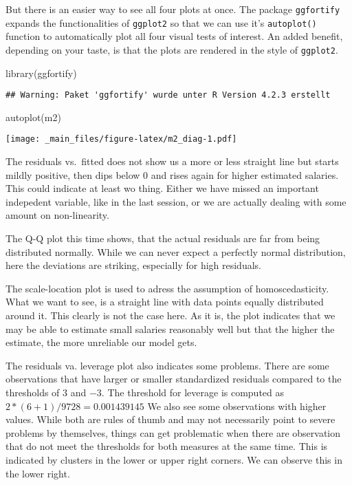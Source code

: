 \documentclass[
]{book}
\newenvironment{Shaded}{\begin{snugshade}}{\end{snugshade}}
\newcommand{\FunctionTok}[1]{\textcolor[rgb]{0.00,0.00,0.00}{#1}}
\newcommand{\NormalTok}[1]{#1}
\begin{document}
But there is an easier way to see all four plots at once. The package
\texttt{ggfortify} expands the functionalities of \texttt{ggplot2} so that we can use it's
\texttt{autoplot()} function to automatically plot all four visual tests of interest.
An added benefit, depending on your taste, is that the plots are rendered in the
style of \texttt{ggplot2}.

\begin{Shaded}
\begin{Highlighting}[]
\FunctionTok{library}\NormalTok{(ggfortify)}
\end{Highlighting}
\end{Shaded}

\begin{verbatim}
## Warning: Paket 'ggfortify' wurde unter R Version 4.2.3 erstellt
\end{verbatim}

\begin{Shaded}
\begin{Highlighting}[]
\FunctionTok{autoplot}\NormalTok{(m2)}
\end{Highlighting}
\end{Shaded}

\texttt{[image: \_main\_files/figure-latex/m2\_diag-1.pdf]}

The residuals vs.~fitted does not show us a more or less straight line but
starts mildly positive, then dips below \(0\) and rises again for higher estimated
salaries. This could indicate at least wo thing. Either we have missed an
important indepedent variable, like in the last session, or we are actually
dealing with some amount on non-linearity.

The Q-Q plot this time shows, that the actual residuals are far from being
distributed normally. While we can never expect a perfectly normal distribution,
here the deviations are striking, especially for high residuals.

The scale-location plot is used to adress the assumption of homoscedasticity.
What we want to see, is a straight line with data points equally distributed
around it. This clearly is not the case here. As it is, the plot indicates
that we may be able to estimate small salaries reasonably well but that the
higher the estimate, the more unreliable our model gets.

The residuals va. leverage plot also indicates some problems. There are some
observations that have larger or smaller standardized residuals compared to the
thresholds of \(3\) and \(-3\). The threshold for leverage is computed as
\(2 * (6 + 1) / 9728 = 0.001439145\) We also see some observations with higher
values. While both are rules of thumb and may not necessarily point to severe
problems by themselves, things can get problematic when there are observation
that do not meet the thresholds for both measures at the same time. This is
indicated by clusters in the lower or upper right corners. We can observe this
in the lower right.
\end{document}
